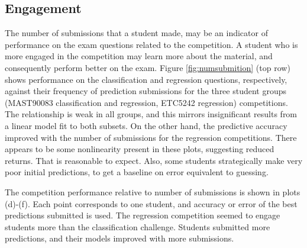 \documentclass[12pt]{article}
\begin{document}
\subsection{Engagement}\label{engagement-1}

The number of submissions that a student made, may be an indicator of
performance on the exam questions related to the competition. A student
who is more engaged in the competition may learn more about the
material, and consequently perform better on the exam. Figure
\ref{fig:numsubmition} (top row) shows performance on the classification
and regression questions, respectively, against their frequency of
prediction submissions for the three student groups (MAST90083
classification and regression, ETC5242 regression) competitions. The
relationship is weak in all groups, and this mirrors insignificant
results from a linear model fit to both subsets. On the other hand, the
predictive accuracy improved with the number of submissions for the
regression competitions. There appears to be some nonlinearity present
in these plots, suggesting reduced returns. That is reasonable to
expect. Also, some students strategically make very poor initial
predictions, to get a baseline on error equivalent to guessing.

The competition performance relative to number of submissions is shown
in plots (d)-(f). Each point corresponds to one student, and accuracy or
error of the best predictions submitted is used. The regression
competition seemed to engage students more than the classification
challenge. Students submitted more predictions, and their models
improved with more submissions.
\end{document}
